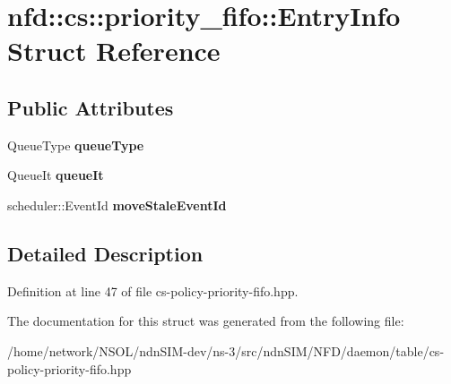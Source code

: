 \hypertarget{structnfd_1_1cs_1_1priority__fifo_1_1EntryInfo}{}\section{nfd\+:\+:cs\+:\+:priority\+\_\+fifo\+:\+:Entry\+Info Struct Reference}
\label{structnfd_1_1cs_1_1priority__fifo_1_1EntryInfo}
\subsection*{Public Attributes}
\begin{DoxyCompactItemize}
\item 
Queue\+Type {\bfseries queue\+Type}\hypertarget{structnfd_1_1cs_1_1priority__fifo_1_1EntryInfo_ae90a603b91811b2644e7f831eb17325f}{}\label{structnfd_1_1cs_1_1priority__fifo_1_1EntryInfo_ae90a603b91811b2644e7f831eb17325f}

\item 
Queue\+It {\bfseries queue\+It}\hypertarget{structnfd_1_1cs_1_1priority__fifo_1_1EntryInfo_aac1f09d5f1ec3b7cca03f053a44a362a}{}\label{structnfd_1_1cs_1_1priority__fifo_1_1EntryInfo_aac1f09d5f1ec3b7cca03f053a44a362a}

\item 
scheduler\+::\+Event\+Id {\bfseries move\+Stale\+Event\+Id}\hypertarget{structnfd_1_1cs_1_1priority__fifo_1_1EntryInfo_a62870498db081002d7a21ce5fda8fae8}{}\label{structnfd_1_1cs_1_1priority__fifo_1_1EntryInfo_a62870498db081002d7a21ce5fda8fae8}

\end{DoxyCompactItemize}


\subsection{Detailed Description}


Definition at line 47 of file cs-\/policy-\/priority-\/fifo.\+hpp.



The documentation for this struct was generated from the following file\+:\begin{DoxyCompactItemize}
\item 
/home/network/\+N\+S\+O\+L/ndn\+S\+I\+M-\/dev/ns-\/3/src/ndn\+S\+I\+M/\+N\+F\+D/daemon/table/cs-\/policy-\/priority-\/fifo.\+hpp\end{DoxyCompactItemize}
